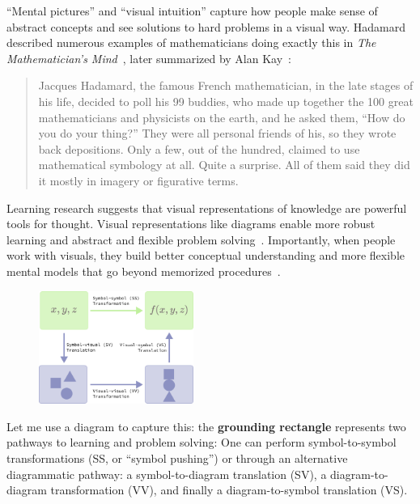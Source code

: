 
``Mental pictures'' and ``visual intuition'' capture how people make sense of abstract concepts and see solutions to hard problems in a visual way. Hadamard described numerous examples of mathematicians doing exactly this in \emph{The Mathematician's Mind}~\cite{Hadamard1997a}, later summarized by Alan Kay~\cite{doingWithImages}:

\begin{quote}
Jacques Hadamard, the famous French mathematician, in the late stages of his life, decided to poll his 99 buddies, who made up together the 100 great mathematicians and physicists on the earth, and he asked them, ``How do you do your thing?'' They were all personal friends of his, so they wrote back depositions. Only a few, out of the hundred, claimed to use mathematical symbology at all. Quite a surprise. All of them said they did it mostly in imagery or figurative terms.
\end{quote}

Learning research suggests that visual representations of knowledge are powerful tools for thought. Visual representations like diagrams enable more robust learning \cite{multimediaLearning} and abstract and flexible problem solving~\cite{Koedinger1990a, pictureAlgebra, DiagramsThousandWords}. Importantly, when people work with visuals, they build better conceptual understanding and more flexible mental models that go beyond memorized procedures~\cite{multipleReps}.

\setlength{\columnsep}{1em}
\setlength{\intextsep}{0em}
\begin{figure}
\vspace{-10pt}
  \begin{center}
    \includegraphics[width=0.45\textwidth]{assets/chapter-1/grounding-rectangle.pdf}
  \end{center}
\end{figure}

Let me use a diagram to capture this: the \textbf{grounding rectangle} represents two pathways to learning and problem solving: One can perform symbol-to-symbol transformations (SS, or “symbol pushing”) or through an \textcolor[HTML]{8C91C2}{alternative diagrammatic pathway}: a symbol-to-diagram translation (SV), a diagram-to-diagram transformation (VV), and finally a diagram-to-symbol translation (VS).

